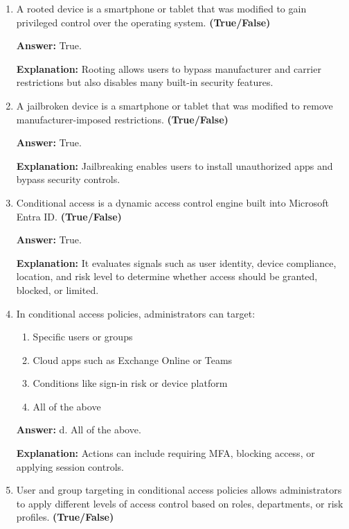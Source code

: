 \documentclass[10pt]{article}
\begin{document}
\begin{enumerate}[leftmargin=*]
\textbf{Answer:} True.

\textbf{Explanation:} They are especially useful for unmanaged or bring-your-own-device scenarios.

\item A rooted device is a smartphone or tablet that was modified to gain privileged control over the operating system. \textbf{(True/False)}

\textbf{Answer:} True.

\textbf{Explanation:} Rooting allows users to bypass manufacturer and carrier restrictions but also disables many built-in security features.

\item A jailbroken device is a smartphone or tablet that was modified to remove manufacturer-imposed restrictions. \textbf{(True/False)}

\textbf{Answer:} True.

\textbf{Explanation:} Jailbreaking enables users to install unauthorized apps and bypass security controls.

\item Conditional access is a dynamic access control engine built into Microsoft Entra ID. \textbf{(True/False)}

\textbf{Answer:} True.

\textbf{Explanation:} It evaluates signals such as user identity, device compliance, location, and risk level to determine whether access should be granted, blocked, or limited.

\item In conditional access policies, administrators can target:
\begin{enumerate}[label=\alph*., leftmargin=1.5em]
\item Specific users or groups
\item Cloud apps such as Exchange Online or Teams
\item Conditions like sign-in risk or device platform
\item All of the above
\end{enumerate}
\textbf{Answer:} d. All of the above.

\textbf{Explanation:} Actions can include requiring MFA, blocking access, or applying session controls.

\item User and group targeting in conditional access policies allows administrators to apply different levels of access control based on roles, departments, or risk profiles. \textbf{(True/False)}


\end{enumerate}
\end{document}
